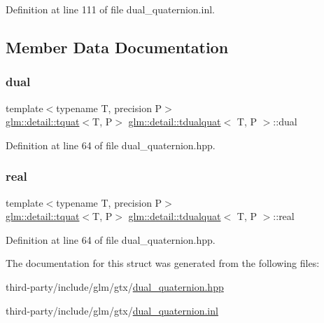 Definition at line 111 of file dual\+\_\+quaternion.\+inl.



\subsection{Member Data Documentation}
\mbox{\label{structglm_1_1detail_1_1tdualquat_a6d739e4771a6244cc15562c2ecda7fdc}} 
\subsubsection{\texorpdfstring{dual}{dual}}
{\footnotesize\ttfamily template$<$typename T, precision P$>$ \\
\hyperlink{structglm_1_1detail_1_1tquat}{glm\+::detail\+::tquat}$<$T, P$>$ \hyperlink{structglm_1_1detail_1_1tdualquat}{glm\+::detail\+::tdualquat}$<$ T, P $>$\+::dual}



Definition at line 64 of file dual\+\_\+quaternion.\+hpp.

\mbox{\label{structglm_1_1detail_1_1tdualquat_abebb177d1dca2b170fe7d01e9970eb37}} 
\subsubsection{\texorpdfstring{real}{real}}
{\footnotesize\ttfamily template$<$typename T, precision P$>$ \\
\hyperlink{structglm_1_1detail_1_1tquat}{glm\+::detail\+::tquat}$<$T, P$>$ \hyperlink{structglm_1_1detail_1_1tdualquat}{glm\+::detail\+::tdualquat}$<$ T, P $>$\+::real}



Definition at line 64 of file dual\+\_\+quaternion.\+hpp.



The documentation for this struct was generated from the following files\+:\begin{DoxyCompactItemize}
\item 
third-\/party/include/glm/gtx/\hyperlink{dual__quaternion_8hpp}{dual\+\_\+quaternion.\+hpp}\item 
third-\/party/include/glm/gtx/\hyperlink{dual__quaternion_8inl}{dual\+\_\+quaternion.\+inl}\end{DoxyCompactItemize}
